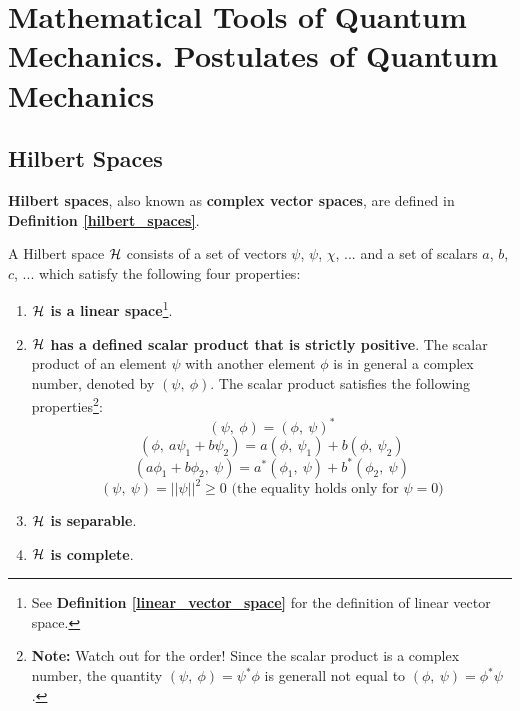 \section{Mathematical Tools of Quantum Mechanics. Postulates of Quantum Mechanics}

\subsection{Hilbert Spaces}

\textbf{Hilbert spaces}, also known as \textbf{complex vector spaces}, are defined in \textbf{Definition \ref{hilbert_spaces}}.

\begin{definition} \label{hilbert_spaces}
    A Hilbert space $\mathcal{H}$ consists of a set of vectors $\psi$, $\psi$, $\chi$, ... and a set of scalars $a$, $b$, $c$, ... which satisfy the following four properties:

    \begin{enumerate}
        \item \textbf{$\mathcal{H}$ is a linear space}\footnote{See \textbf{Definition \ref{linear_vector_space}} for the definition of linear vector space.}.
        \item \textbf{$\mathcal{H}$ has a defined scalar product that is strictly positive}. The scalar product of an element $\psi$ with another element $\phi$ is in general a complex number, denoted by $(\psi,\ \phi)$. The scalar product satisfies the following properties\footnote{\textbf{Note:} Watch out for the order! Since the scalar product is a complex number, the quantity $(\psi,\ \phi) = \psi^*\phi$ is generall not equal to $(\phi,\ \psi) = \phi^*\psi$.}:
        \begin{equation}
            (\psi,\ \phi) = (\phi,\ \psi)^*
        \end{equation}
        \begin{equation}
            (\phi,\ a\psi_1 + b\psi_2) = a(\phi,\ \psi_1) + b(\phi,\ \psi_2)
        \end{equation}
        \begin{equation}
            (a\phi_1 + b\phi_2,\ \psi) = a^*(\phi_1,\ \psi) + b^*(\phi_2,\ \psi)
        \end{equation}
        \begin{equation}
            (\psi,\ \psi) = ||\psi||^2 \geq 0 \text{ (the equality holds only for } \psi = 0\text{)}
        \end{equation}
        \item \textbf{$\mathcal{H}$ is separable}.
        \item \textbf{$\mathcal{H}$ is complete}.
    \end{enumerate}
\end{definition}

